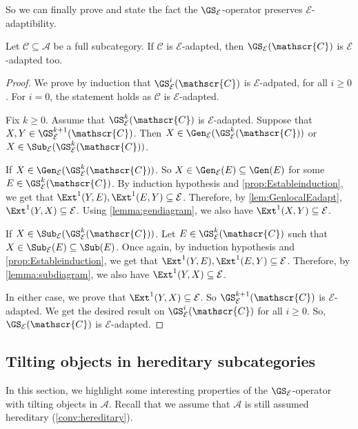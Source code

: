 So we can finally prove and state the fact the $\GS_\mathcal{E}$-operator preserves $\mathcal{E}$-adaptibility.

\begin{prop}
\label{prop:EAdapt}
Let $\mathscr{C} \subseteq \mathscr{A}$ be a full subcategory. If $\mathscr{C}$ is $\mathcal{E}$-adapted, then $\GS_{\mathcal{E}}(\mathscr{C})$ is $\mathcal{E}$-adapted too.
\end{prop}

\begin{proof}
We prove by induction that $\GS^{i}_{\mathcal{E}}(\mathscr{C})$ is ${\mathcal{E}}$-adpated, for all $i \geq 0$. For $i=0$, the statement holds as $\mathcal{C}$ is $\mathcal{E}$-adapted.

Fix $k \geqslant 0$. Assume that  $\GS^{k}_{\mathcal{E}}(\mathscr{C})$ is ${\mathcal{E}}$-adapted. Suppose that $X,Y \in \GS^{k+1}_{\mathcal{E}}(\mathscr{C})$. Then $X \in \Gen_{\mathcal{E}}(\GS^{k}_{\mathcal{E}}(\mathscr{C}))$ or $X \in \Sub_{\mathcal{E}}(\GS^{k}_{\mathcal{E}}(\mathscr{C}))$.

If $X \in \Gen_{\mathcal{E}}(\GS^{k}_{\mathcal{E}}(\mathscr{C}))$. So $X \in \Gen_{\mathcal{E}}(E) \subseteq \Gen(E)$ for some $E \in \GS^{k}_{\mathcal{E}}(\mathscr{C})$. By induction hypothesis and \cref{prop:Estableinduction}, we get that $\Ext^1(Y,E),\Ext^1(E,Y) \subseteq \mathcal{E}$. Therefore, by \cref{lem:GenlocalEadapt}, $\Ext^1(Y,X) \subseteq \mathcal{E}$. Using \cref{lemma:gendiagram}, we also have $\Ext^1(X,Y) \subseteq \mathcal{E}$.

If $X \in \Sub_{\mathcal{E}}(\GS^{k}_{\mathcal{E}}(\mathscr{C}))$. Let $E \in \GS^{k}_{\mathcal{E}}(\mathscr{C})$ such that $X \in \Sub_{\mathcal{E}}(E) \subseteq \Sub(E)$. Once again, by induction hypothesis and \cref{prop:Estableinduction}, we get that $\Ext^1(Y,E),\Ext^1(E,Y) \subseteq \mathcal{E}$. Therefore, by \cref{lemma:subdiagram}, we also have $\Ext^1(Y,X) \subseteq \mathcal{E}$.

In either case, we prove that $\Ext^1(Y,X) \subseteq \mathcal{E}$. So $\GS^{k+1}_{\mathcal{E}}(\mathscr{C})$ is $\mathcal{E}$-adapted. We get the desired result on $\GS^{i}_{\mathcal{E}}(\mathscr{C})$ for all $i \geq 0$. So, $\GS_{\mathcal{E}}(\mathscr{C})$ is  $\mathcal{E}$-adapted.
\end{proof}

\subsection{Tilting objects in hereditary subcategories}
\label{ss:Tilting} In this section, we highlight some interesting properties of the $\GS_\mathcal{E}$-operator with tilting objects in $\mathscr{A}$. Recall that we assume that $\mathscr{A}$ is still assumed hereditary (\cref{conv:hereditary}).

